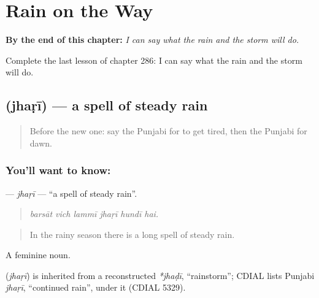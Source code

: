 
\chapter{Rain on the Way}
\label{ch:pa-a2-rain-on-the-way}

\begin{chapteropening}
\textbf{By the end of this chapter:} \emph{I can say what the rain and the storm will do.}

Complete the last lesson of chapter 286: I can say what the rain and the storm will do.
\end{chapteropening}

\section[\texorpdfstring{\pa{ਝੜੀ} (jhaṛī)}{ਝੜੀ (jhaṛī)}]{ (jhaṛī) — a spell of steady rain}

\label{lesson:PA-C286-jhari}



\begin{quote}
Before the new one: say the Punjabi for to get tired, then the Punjabi for dawn.
\end{quote}

\subsection*{You'll want to know: }
\textbf{} — \emph{jhaṛī} — \textquotedblleft{}a spell of steady rain\textquotedblright{}.

\begin{quote}
     
\end{quote}

\begin{quote}
\emph{barsāt vich lammī jhaṛī hundī hai.}
\end{quote}

\begin{quote}
In the rainy season there is a long spell of steady rain.
\end{quote}

A feminine noun.

\begin{cousinweb}
\textbf{} (\emph{jhaṛī}) is inherited from a reconstructed \emph{*jhaḍī}, \textquotedblleft{}rainstorm\textquotedblright{}; CDIAL lists Punjabi \emph{jhaṛī}, \textquotedblleft{}continued rain\textquotedblright{}, under it (CDIAL 5329).
\end{cousinweb}

